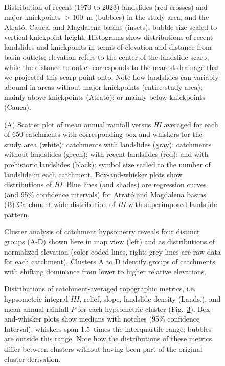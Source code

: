 \documentclass[draft]{agujournal2019}
\begin{document}
\begin{figure}[ht!]
    \caption{Distribution of recent (1970 to 2023) landslides (red crosses) and major knickpoints $>$100~m (bubbles) in the study area, and the Atrató, Cauca, and Magdalena basins (insets); bubble size scaled to vertical knickpoint height. Histograms show distributions of recent landslides and knickpoints in terms of elevation and distance from basin outlets; elevation refers to the center of the landslide scarp, while the distance to outlet corresponds to the nearest drainage that we projected this scarp point onto. Note how landslides can variably abound in areas without major knickpoints (entire study area); mainly above knickpoints (Atrató); or mainly below knickpoints (Cauca).}
  \label{fig:profiles}
\end{figure}

\begin{figure}[ht!]
    \caption{(A) Scatter plot of mean annual rainfall versus \textit{HI} averaged for each of 650 catchments with corresponding box-and-whiskers for the study area (white); catchments with landslides (gray): catchments without landslides (green); with recent landslides (red): and with prehistoric landslides (black); symbol size scaled to the number of landslide in each catchment. Box-and-whisker plots show distributions of \textit{HI}. Blue lines (and shades) are regression curves (and 95\% confidence intervals) for Atrató and Magdalena basins. (B) Catchment-wide distribution of \textit{HI} with superimposed landslide pattern.}
    \label{fig:hypso}
\end{figure}


\begin{figure}[ht!]
    \caption{Cluster analysis of catchment hypsometry reveals four distinct groups (A-D) shown here in map view (left) and as distributions of normalized elevation (color-coded lines, right; grey lines are raw data for each catchment). Clusters A to D identify groups of catchments with shifting dominance from lower to higher relative elevations.}
    \label{fig:knickpoints}
\end{figure}

\begin{figure}[ht!]
    \caption{Distributions of catchment-averaged topographic metrics, i.e. hypsometric integral $HI$, relief, slope, landslide density (Lands.), and mean annual rainfall $P$ for each hypsometric cluster (Fig.~\ref{fig:knickpoints}). Box-and-whisker plots show medians with notches (95\% confidence Interval); whiskers span 1.5~times the interquartile range; bubbles are outside this range. Note how the distributions of these metrics differ between clusters without having been part of the original cluster derivation.}
  \label{fig:cluster2}
\end{figure}
\end{document}
